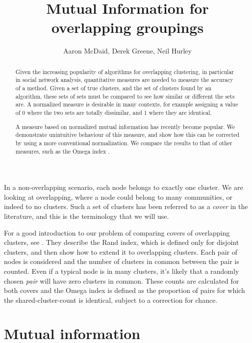 \documentclass[9pt,technote]{IEEEtran}
\author{Aaron McDaid, Derek Greene, Neil Hurley}
\title{Mutual Information for overlapping groupings}
\begin{document}
\maketitle


\newcommand{\grouping}{\emph{grouping{}}}
\newcommand{\lfk}{\cite{lancichinetti-2009} {}}

\begin{abstract}
Given the increasing popularity of algorithms for overlapping clustering, in particular in social network analysis, quantitative measures are needed to measure the accuracy of a method.
Given a set of true clusters, and the set of clusters found by an algorithm, these sets of sets must be compared to see how similar or different the sets are.
A normalized measure is desirable in many contexts, for example assigning a value of 0 where the two sets are totally dissimilar, and 1 where they are identical.

A measure based on normalized mutual information has recently become popular. We demonstrate unintuitive behaviour of this measure, and show how this can be corrected
by using a more conventional normalization. We compare the results to that of other measures, such as the Omega index \cite{collins1988omega}.
\end{abstract}


In a non-overlapping scenario, each node belongs to exactly one cluster. We are looking at overlapping, where a node could belong to many communities, or indeed to no clusters.
Such a set of clusters has been referred to as a \emph{cover} in the literature, and this is the terminology that we will use.

For a good introduction to our problem of comparing covers of overlapping clusters, see \cite{collins1988omega}.
They describe the Rand index, which is defined only for disjoint clusters, and then show how to extend it to overlapping clusters.
Each pair of nodes is considered and the number of clusters in common between the pair is counted. Even if a typical node is in many clusters,
it's likely that a randomly chosen \emph{pair} will have zero clusters in common.
These counts are calculated for both covers and the Omega index is defined as the proportion of pairs for which the shared-cluster-count is identical,
subject to a correction for chance.

\section{Mutual information}
\end{document}
